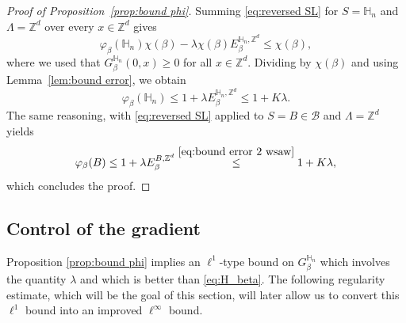 \documentclass[11pt,a4paper]{article}
\numberwithin{equation}{section}
\theoremstyle{plain}
\theoremstyle{definition}
\newtheorem{Rem}[Thm]{Remark}
\begin{document}
\begin{proof}[Proof of Proposition~\textup{\ref{prop:bound phi}}]
Summing \eqref{eq:reversed SL} for $S=\mathbb H_n$ and $\Lambda=\mathbb Z^d$ over every $x\in \mathbb Z^d$ gives
\begin{equation}\label{eq: bound phi_n1 wsaw}
\varphi_{\beta}(\mathbb H_n)\chi(\beta)-\lambda \chi(\beta)E_{ \beta}^{\mathbb H_n,\mathbb Z^d}\leq \chi(\beta),
\end{equation}
where we used that $G^{\mathbb H_n}_\beta(0,x)\geq 0$ for all $x\in \mathbb Z^d$. Dividing by $\chi(\beta)$ and using Lemma~\ref{lem:bound error}, we obtain
\begin{equation}
    \varphi_{\beta}(\mathbb H_n)\leq 1+\lambda E_{\beta}^{\mathbb H_n,\mathbb Z^d}\le 1+K\lambda.
   \end{equation}
The same reasoning, with \eqref{eq:reversed SL} applied to $S=B\in \mathcal B$ and $\Lambda=\mathbb Z^d$ yields
\begin{equation}
	\varphi_\beta(B)\leq 1+\lambda E_\beta^{B,\mathbb Z^d}\stackrel{\eqref{eq:bound error 2 wsaw}}\leq 1+K\lambda,
\end{equation}
which concludes the proof.
\end{proof}



\subsection{Control of the gradient}

Proposition \ref{prop:bound phi} implies an $\ell^1$-type bound on $G_\beta^{\mathbb H_n}$ which involves the quantity $\lambda$ and which is  better than \eqref{eq:H_beta}. The following regularity estimate, which will be the goal of this section, will later allow us to convert this $\ell^1$ bound into an improved $\ell^\infty$ bound. 
\end{document}
